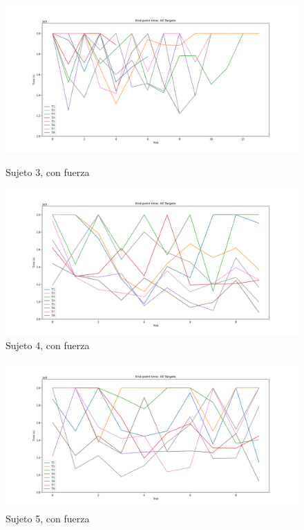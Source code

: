 \documentclass[a4paper,11pt, oneside]{book}
\begin{document}
\begin{figure}[h]
	\begin{minipage}[b]{0.5\linewidth}
		\centering
		\includegraphics[width=\linewidth]{sujeto3/force/evolution_time}
		\caption{Sujeto 3, con fuerza}
		\label{fig:figura1}
	\end{minipage}
	\hspace{0.5cm}
	\begin{minipage}[b]{0.5\linewidth}
		\centering
		\includegraphics[width=\linewidth]{sujeto4/force/evolution_time}
		\caption{Sujeto 4, con fuerza}
		\label{fig:figura2}
	\end{minipage}
\end{figure}
\begin{figure}[H]
	\begin{minipage}[b]{0.5\linewidth}
		\centering
		\includegraphics[width=\linewidth]{sujeto5/force/evolution_time}
		\caption{Sujeto 5, con fuerza}
		\label{fig:figura1}
	\end{minipage}
\end{figure}
\end{document}
